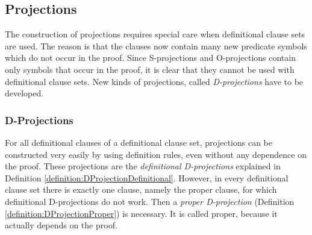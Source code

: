 \subsection{Projections}

The construction of projections requires special care when definitional clause sets are used. The reason is that the clauses now contain many new predicate symbols which do not occur in the proof. Since S-projections and O-projections contain only symbols that occur in the proof, it is clear that they cannot be used with definitional clause sets. New kinds of projections, called \emph{D-projections} have to be developed.


\subsubsection{D-Projections}

For all definitional clauses of a definitional clause set, projections can be constructed very easily by using definition rules, even without any dependence on the proof. These projections are the \emph{definitional D-projections} explained in Definition \ref{definition:DProjectionDefinitional}. However, in every definitional clause set there is exactly one clause, namely the proper clause, for which definitional D-projections do not work. Then a \emph{proper D-projection} (Definition \ref{definition:DProjectionProper}) is necessary. It is called proper, because it actually depends on the proof.



